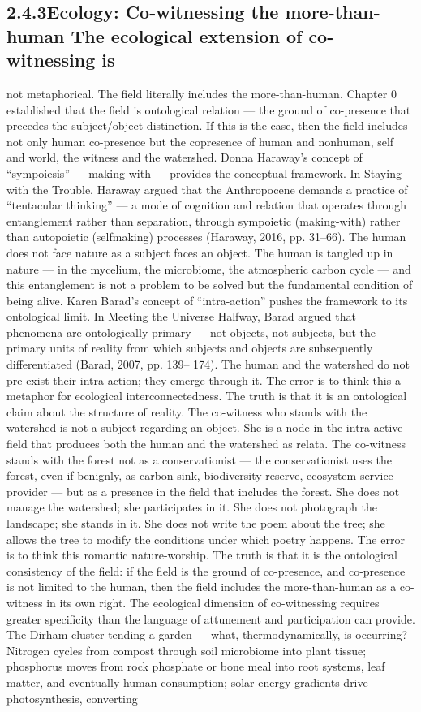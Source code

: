 \subsection{2.4.3\quad Ecology: Co-witnessing the more-than-human The ecological extension of co-witnessing is}

not metaphorical. The field literally includes the more-than-human. Chapter 0 established that the field is ontological relation — the ground of co-presence that precedes the subject/object distinction. If this is the case, then the field includes not only human co-presence but the copresence of human and nonhuman, self and world, the witness and the watershed. Donna Haraway’s concept of “sympoiesis” — making-with — provides the conceptual framework. In Staying with the Trouble, Haraway argued that the Anthropocene demands a practice of “tentacular thinking” — a mode of cognition and relation that operates through entanglement rather than separation, through sympoietic (making-with) rather than autopoietic (selfmaking) processes (Haraway, 2016, pp. 31–66). The human does not face nature as a subject faces an object. The human is tangled up in nature — in the mycelium, the microbiome, the atmospheric carbon cycle — and this entanglement is not a problem to be solved but the fundamental condition of being alive. Karen Barad’s concept of “intra-action” pushes the framework to its ontological limit. In Meeting the Universe Halfway, Barad argued that phenomena are ontologically primary — not objects, not subjects, but the primary units of reality from which subjects and objects are subsequently differentiated (Barad, 2007, pp. 139– 174). The human and the watershed do not pre-exist their intra-action; they emerge through it. The error is to think this a metaphor for ecological interconnectedness. The truth is that it is an ontological claim about the structure of reality. The co-witness who stands with the watershed is not a subject regarding an object. She is a node in the intra-active field that produces both the human and the watershed as relata. The co-witness stands with the forest not as a conservationist — the conservationist uses the forest, even if benignly, as carbon sink, biodiversity reserve, ecosystem service provider — but as a presence in the field that includes the forest. She does not manage the watershed; she participates in it. She does not photograph the landscape; she stands in it. She does not write the poem about the tree; she allows the tree to modify the conditions under which poetry happens. The error is to think this romantic nature-worship. The truth is that it is the ontological consistency of the field: if the field is the ground of co-presence, and co-presence is not limited to the human, then the field includes the more-than-human as a co-witness in its own right. The ecological dimension of co-witnessing requires greater specificity than the language of attunement and participation can provide. The Dirham cluster tending a garden — what, thermodynamically, is occurring? Nitrogen cycles from compost through soil microbiome into plant tissue; phosphorus moves from rock phosphate or bone meal into root systems, leaf matter, and eventually human consumption; solar energy gradients drive photosynthesis, converting 